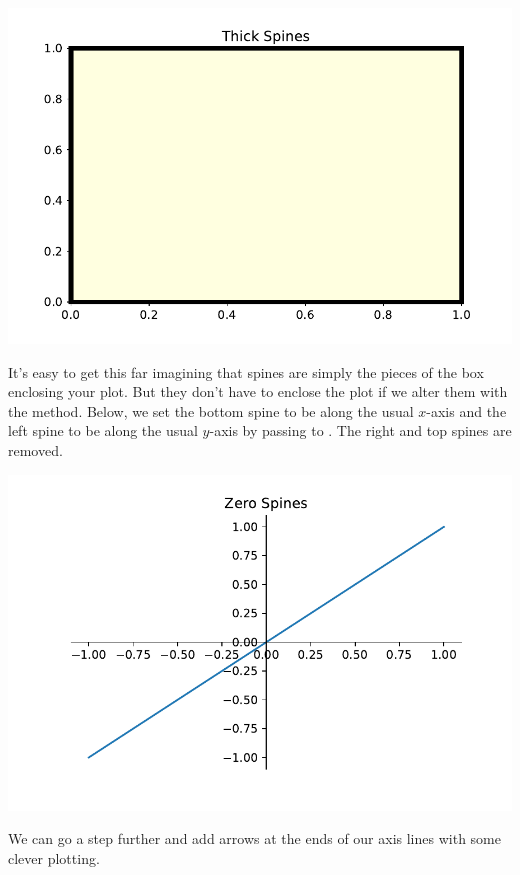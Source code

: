 \begin{center}
    \includegraphics[width = .7\textwidth]{figures/proseplots/thick-spines.pdf}
\end{center}

It's easy to get this far imagining that spines are simply the pieces of the box enclosing your plot. But they don't have to enclose the plot if we alter them with the  method. Below, we set the bottom spine to be along the usual $x$-axis and the left spine to be along the usual $y$-axis by passing  to . The right and top spines are removed. 


\begin{center}
    \includegraphics[width = .7\textwidth]{figures/proseplots/zero-spines.pdf}
\end{center}

We can go a step further and add arrows at the ends of our axis lines with some clever plotting. 


